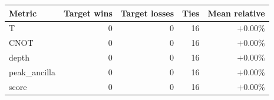\begin{tabular}{lrrrr}
\toprule
Metric & Target wins & Target losses & Ties & Mean relative \\
\midrule
T & 0 & 0 & 16 & $+0.00\%$ \\
CNOT & 0 & 0 & 16 & $+0.00\%$ \\
depth & 0 & 0 & 16 & $+0.00\%$ \\
peak_ancilla & 0 & 0 & 16 & $+0.00\%$ \\
score & 0 & 0 & 16 & $+0.00\%$ \\
\bottomrule
\end{tabular}
